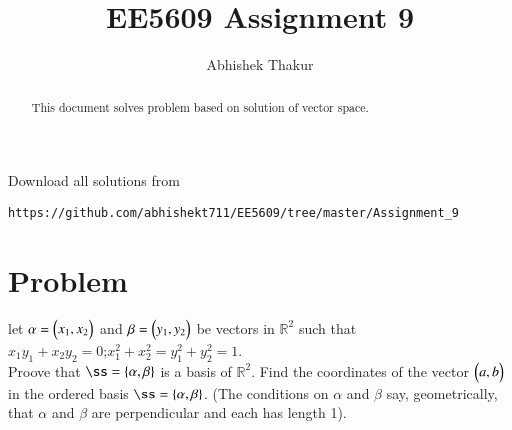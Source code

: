 \documentclass[journal,12pt,twocolumn]{IEEEtran}
\begin{document}
     \def\rightbox#1{\makebox[0in][r]{#1}}
     \def\centbox#1{\makebox[0in]{#1}}
     \def\topbox#1{\raisebox{-\baselineskip}[0in][0in]{#1}}
     \def\midbox#1{\raisebox{-0.5\baselineskip}[0in][0in]{#1}}
\vspace{3cm}
\title{EE5609 Assignment 9}
\author{Abhishek Thakur}
\maketitle
\newpage
\bigskip
\renewcommand{\thefigure}{\theenumi}
\renewcommand{\thetable}{\theenumi}
\begin{abstract}
This document solves problem based on solution of vector space.
\end{abstract}
Download all solutions from 
\begin{lstlisting}
https://github.com/abhishekt711/EE5609/tree/master/Assignment_9
\end{lstlisting}
\section{Problem}
let $\alpha=\begin{pmatrix}x_1,x_2\end{pmatrix}$ and $\beta=\begin{pmatrix}y_1,y_2\end{pmatrix}$ be vectors in $\mathbb{R}^2$ such that\\
$x_1y_1+x_2y_2=0$;\quad $x_1^2+x_2^2=y_1^2+y_2^2=1$.\\
Proove that $\ss=\{\vec{\alpha},\vec{\beta}\}$ is a basis of $\mathbb{R}^2$. Find the coordinates of the vector $\begin{pmatrix}a,b\end{pmatrix}$ in the ordered basis $\ss=\{\vec{\alpha},\vec{\beta}\}$. (The conditions on $\alpha$ and $\beta$ say, geometrically, that $\alpha$ and $\beta$ are perpendicular and each has length 1).
\end{document}
